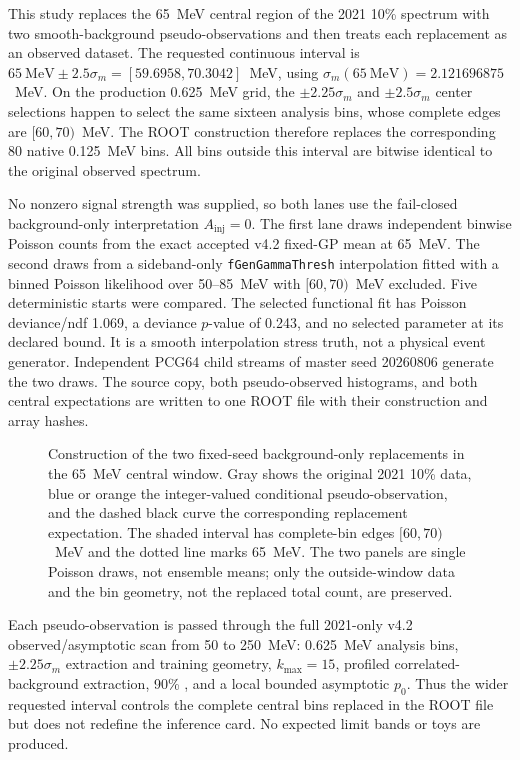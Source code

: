 This study replaces the 65~MeV central region of the 2021 10\% spectrum with
two smooth-background pseudo-observations and then treats each replacement as
an observed dataset.  The requested continuous interval is
$65~\mathrm{MeV}\pm2.5\sigma_m=[59.6958,70.3042]$~MeV, using
$\sigma_m(65~\mathrm{MeV})=2.121696875$~MeV.  On the production 0.625~MeV
grid, the $\pm2.25\sigma_m$ and $\pm2.5\sigma_m$ center selections happen to
select the same sixteen analysis bins, whose complete edges are
$[60,70)$~MeV.  The ROOT construction therefore replaces the corresponding
80 native 0.125~MeV bins.  All bins outside this interval are bitwise identical
to the original observed spectrum.

No nonzero signal strength was supplied, so both lanes use the fail-closed
background-only interpretation $A_{\mathrm{inj}}=0$.  The first lane draws
independent binwise Poisson counts from the exact accepted v4.2 fixed-GP mean
at 65~MeV.  The second draws from a sideband-only
\texttt{fGenGammaThresh} interpolation fitted with a binned Poisson
likelihood over 50--85~MeV with $[60,70)$~MeV excluded.  Five deterministic
starts were compared.  The selected functional fit has Poisson
deviance/ndf 1.069, a deviance $p$-value of 0.243, and no selected parameter
at its declared bound.  It is a smooth interpolation stress truth, not a
physical event generator.  Independent PCG64 child streams of master seed
20260806 generate the two draws.  The source copy, both pseudo-observed
histograms, and both central expectations are written to one ROOT file with
their construction and array hashes.

\begin{figure}[H]
\centering
{}
\caption{Construction of the two fixed-seed background-only replacements in
the 65~MeV central window.  Gray shows the original 2021 10\% data, blue or
orange the integer-valued conditional pseudo-observation, and the dashed black
curve the corresponding replacement expectation.  The shaded interval has
complete-bin edges $[60,70)$~MeV and the dotted line marks 65~MeV.  The two
panels are single Poisson draws, not ensemble means; only the outside-window
data and the bin geometry, not the replaced total count, are preserved.}
\label{fig:appendix-v4p2-pseudo65-construction}
\end{figure}

Each pseudo-observation is passed through the full 2021-only v4.2
observed/asymptotic scan from 50 to 250~MeV: 0.625~MeV analysis bins,
$\pm2.25\sigma_m$ extraction and training geometry, $k_{\max}=15$, profiled
correlated-background extraction, 90\% \CLs{}, and a local bounded
asymptotic $p_0$.  Thus the wider requested interval controls the complete
central bins replaced in the ROOT file but does not redefine the inference
card.  No expected limit bands or toys are produced.

